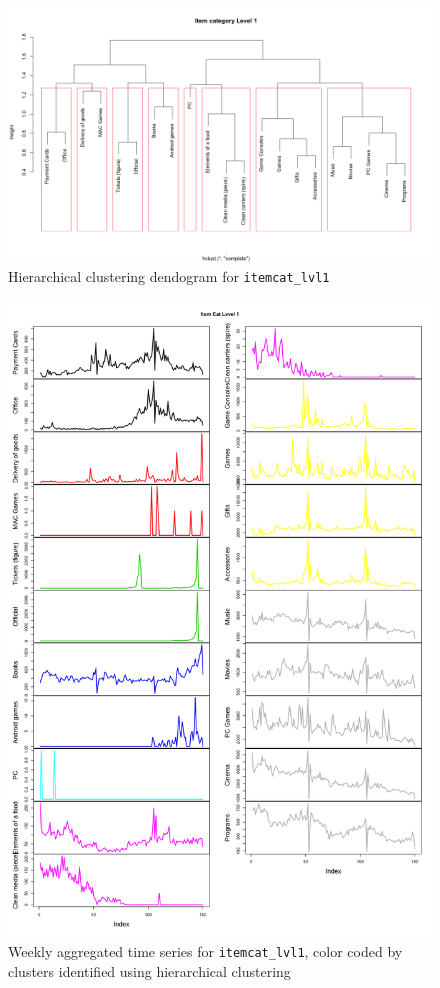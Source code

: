 \documentclass[floatsintext,man]{apa6}
\theoremstyle{definition}
\theoremstyle{definition}
\theoremstyle{definition}
\theoremstyle{remark}
\begin{document}
\begin{figure}
\centering
\includegraphics{../graphs/hclust_itemcat.png}
\caption{Hierarchical clustering dendogram for \texttt{itemcat\_lvl1}}
\end{figure}

\begin{figure}
\centering
\includegraphics{../graphs/zoo_clust_itemcat.png}
\caption{Weekly aggregated time series for \texttt{itemcat\_lvl1}, color
coded by clusters identified using hierarchical clustering}
\end{figure}
\end{document}
